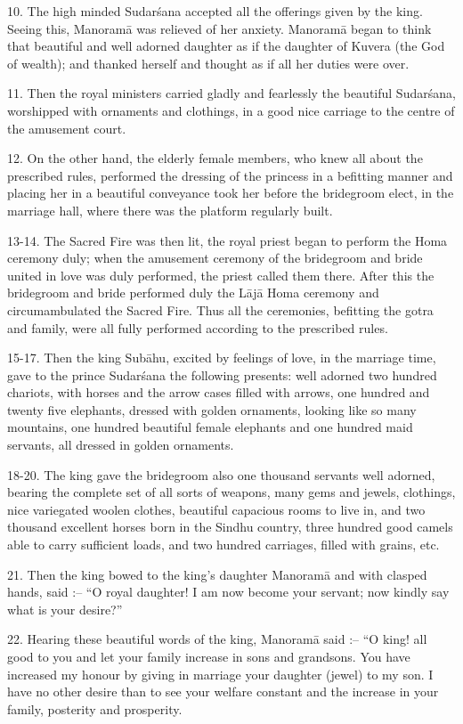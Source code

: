 10. The high minded Sudar\'sana accepted all the offerings given by the king. Seeing this, Manoram\=a was relieved of her anxiety. Manoram\=a began to think that beautiful and well adorned daughter as if the daughter of Kuvera (the God of wealth); and thanked herself and thought as if all her duties were over.

11. Then the royal ministers carried gladly and fearlessly the beautiful Sudar\'sana, worshipped with ornaments and clothings, in a good nice carriage to the centre of the amusement court.

12. On the other hand, the elderly female members, who knew all about the prescribed rules, performed the dressing of the princess in a befitting manner and placing her in a beautiful conveyance took her before the bridegroom elect, in the marriage hall, where there was the platform regularly built.

13-14. The Sacred Fire was then lit, the royal priest began to perform the Homa ceremony duly; when the amusement ceremony of the bridegroom and bride united in love was duly performed, the priest called them there. After this the bridegroom and bride performed duly the L\=aj\=a Homa ceremony and circumambulated the Sacred Fire. Thus all the ceremonies, befitting the gotra and family, were all fully performed according to the prescribed rules.

15-17. Then the king Sub\=ahu, excited by feelings of love, in the marriage time, gave to the prince Sudar\'sana the following presents: well adorned two hundred chariots, with horses and the arrow cases filled with arrows, one hundred and twenty five elephants, dressed with golden ornaments, looking like so many mountains, one hundred beautiful female elephants and one hundred maid servants, all dressed in golden ornaments.

18-20. The king gave the bridegroom also one thousand servants well adorned, bearing the complete set of all sorts of weapons, many gems and jewels, clothings, nice variegated woolen clothes, beautiful capacious rooms to live in, and two thousand excellent horses born in the Sindhu country, three hundred good camels able to carry sufficient loads, and two hundred carriages, filled with grains, etc.

21. Then the king bowed to the king's daughter Manoram\=a and with clasped hands, said :-- ``O royal daughter! I am now become your servant; now kindly say what is your desire?''

22. Hearing these beautiful words of the king, Manoram\=a said :-- ``O king! all good to you and let your family increase in sons and grandsons. You have increased my honour by giving in marriage your daughter (jewel) to my son. I have no other desire than to see your welfare constant and the increase in your family, posterity and prosperity.

